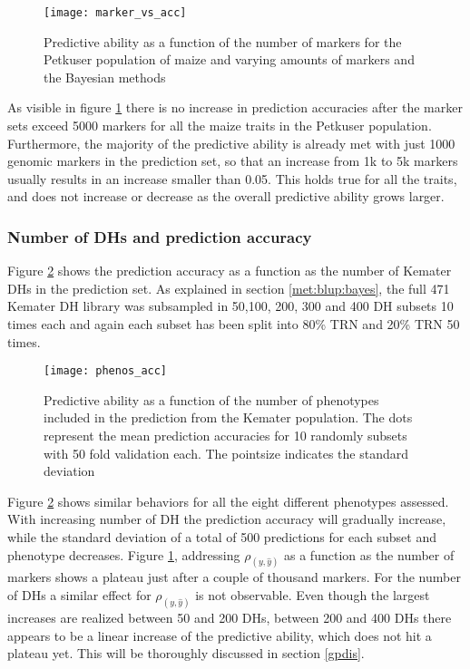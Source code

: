 \begin{figure}[H]
 \centering \texttt{[image: marker\_vs\_acc]}
 \decoRule
 \caption[Predictive ability as a function of the number of markers]{Predictive ability as
   a function of the number of markers for the Petkuser population of maize and varying
   amounts of markers and the Bayesian methods}
\label{fig:marker_vs_acc}
\end{figure}

As visible in figure \ref{fig:marker_vs_acc} there is no increase in prediction accuracies
after the marker sets exceed 5000 markers for all the maize traits in the Petkuser
population. Furthermore, the majority of the predictive ability is already met with just
1000 genomic markers in the prediction set, so that an increase from 1k to 5k markers
usually results in an increase smaller than 0.05. This holds true for all the traits, and
does not increase or decrease as the overall predictive ability grows larger.

\subsubsection{Number of DHs and prediction accuracy}

Figure \ref{fig:phenos_vs_acc} shows the prediction accuracy as a function as the number
of Kemater DHs in the prediction set. As explained in section \ref{met:blup:bayes}, the
full 471 Kemater DH library was subsampled in 50,100, 200, 300 and 400 DH subsets 10 times
each and again each subset has been split into 80\% TRN and 20\% TRN 50 times.

\begin{figure}[H]
 \centering \texttt{[image: phenos\_acc]}
 \decoRule
 \caption[Predictive ability as a function of the number of markers]{Predictive ability as
   a function of the number of phenotypes included in the prediction from the Kemater
   population. The dots represent the mean prediction accuracies for 10 randomly subsets
   with 50 fold validation each. The pointsize indicates the standard deviation}
\label{fig:phenos_vs_acc}
\end{figure}

Figure \ref{fig:phenos_vs_acc} shows similar behaviors for all the eight different
phenotypes assessed. With increasing number of DH the prediction accuracy will gradually
increase, while the standard deviation of a total of 500 predictions for each subset and
phenotype decreases. Figure \ref{fig:marker_vs_acc}, addressing $\rho_{(y,\hat{y})}$ as a
function as the number of markers shows a plateau just after a couple of thousand
markers. For the number of DHs a similar effect for $\rho_{(y,\hat{y})}$ is not
observable. Even though the largest increases are realized between 50 and 200 DHs, between
200 and 400 DHs there appears to be a linear increase of the predictive ability, which
does not hit a plateau yet. This will be thoroughly discussed in section \ref{gpdis}.

